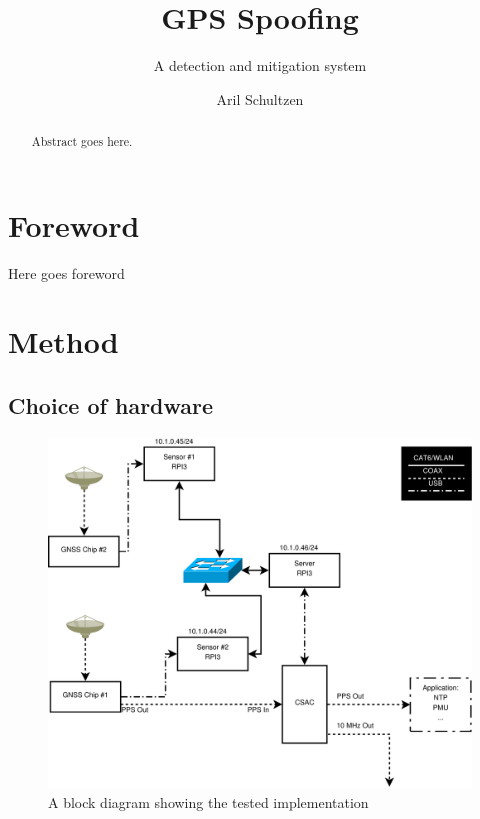 \documentclass[12pt,english,a4paper]{report}
\title{GPS Spoofing}
\subtitle{A detection and mitigation system}
\author{Aril Schultzen}
\begin{document}
\duoforside[dept={Institutt for informatikk},
program={Informatikk: programmering og nettverk},
long]

\begin{abstract}
Abstract goes here.
\end{abstract}

\chapter*{Foreword}
Here goes foreword

\thispagestyle{empty}
\setcounter{page}{0}
\tableofcontents
\thispagestyle{empty}
\setcounter{page}{0}
\thispagestyle{empty}
\setcounter{page}{0}
\clearpage
\setcounter{page}{1}





\chapter{Method}

\section{Choice of hardware}
\begin{figure}\label{ibd}
  \includegraphics[angle=90, scale=0.5]{server_layout.pdf}
   \caption[CSAC SMACC implementation block diagram]{A block diagram showing the tested implementation}
\end{figure}
\end{document}
